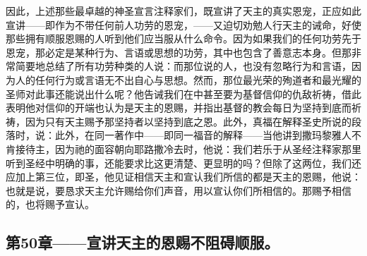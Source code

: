 因此，上述那些最卓越的神圣宣言注释家们，既宣讲了天主的真实恩宠，正应如此宣讲——即作为不带任何前人功劳的恩宠，——又迫切劝勉人行天主的诫命，好使那些拥有顺服恩赐的人听到他们应当服从什么命令。因为如果我们的任何功劳先于恩宠，那必定是某种行为、言语或思想的功劳，其中也包含了善意志本身。但那非常简要地总结了所有功劳种类的人说：而那位说的人，也没有忽略行为和言语，因为人的任何行为或言语无不出自心与思想。然而，那位最光荣的殉道者和最光耀的圣师对此事还能说出什么呢？他告诫我们在中甚至要为基督信仰的仇敌祈祷，借此表明他对信仰的开端也认为是天主的恩赐，并指出基督的教会每日为坚持到底而祈祷，因为只有天主赐予那坚持者以坚持到底之恩。此外，真福在解释圣史所说的段落时，说：此外，在同一著作中——即同一福音的解释——当他讲到撒玛黎雅人不肯接待主，因为祂的面容朝向耶路撒冷去时，他说：我们若乐于从圣经注释家那里听到圣经中明确的事，还能要求比这更清楚、更显明的吗？但除了这两位，我们还应加上第三位，即圣，他见证相信天主和宣认我们所信的都是天主的恩赐，他说：也就是说，要恳求天主允许赐给你们声音，用以宣认你们所相信的。那赐予相信的，也将赐予宣认。\par


\subsection{第50章——宣讲天主的恩赐不阻碍顺服。}

